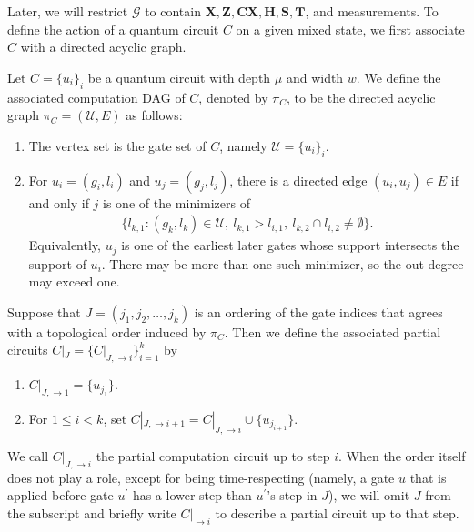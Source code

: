 Later, we will restrict $\mathcal{G}$ to contain $\mathbf{X}, \mathbf{Z}, \mathbf{CX}, \mathbf{H}, \mathbf{S}, \mathbf{T}$, and measurements. To define the action of a quantum circuit $C$ on a given mixed state, we first associate $C$ with a directed acyclic graph.
\begin{definition}
  \label{def:steps}
  Let $C=\{u_i\}_i$ be a quantum circuit with depth $\mu$ and width $w$. We define the associated computation DAG of $C$, denoted by $\pi_C$, to be the directed acyclic graph $\pi_C=(\mathcal{U},E)$ as follows:
  \begin{enumerate}
    \item The vertex set is the gate set of $C$, namely $\mathcal{U}=\{u_i\}_i$.
    \item For $u_i=(g_i,l_i)$ and $u_j=(g_j,l_j)$, there is a directed edge $(u_i,u_j)\in E$ if and only if $j$ is one of the minimizers of
      \begin{equation*}
        \begin{split}
          \big\{ l_{k,1} : (g_k,l_k)\in \mathcal{U},\ l_{k,1}>l_{i,1},\ l_{k,2}\cap l_{i,2}\neq\emptyset \big\}.
        \end{split}
      \end{equation*}
      Equivalently, $u_j$ is one of the earliest later gates whose support intersects the support of $u_i$. There may be more than one such minimizer, so the out-degree may exceed one.
  \end{enumerate}

  Suppose that $J=(j_1,j_2,\ldots,j_k)$ is an ordering of the gate indices that agrees with a topological order induced by $\pi_C$. Then we define the associated partial circuits $C|_J=\{C|_{J,\rightarrow i}\}_{i=1}^{k}$ by
  \begin{enumerate}
    \item $C|_{J,\rightarrow1}=\{u_{j_1}\}$.
    \item For $1\le i<k$, set $ C|_{J,\rightarrow i+1}=C|_{J,\rightarrow i}\cup\{u_{j_{i+1}}\}$.
  \end{enumerate}
We call $C|_{J,\rightarrow i}$ the partial computation circuit up to step $i$. When the order itself does not play a role, except for being time-respecting (namely, a gate $u$ that is applied before gate $u^{\prime}$ has a lower step than $u^{\prime}$'s step in $J$), we will omit $J$ from the subscript and briefly write $C|_{\rightarrow i}$ to describe a partial circuit up to that step.
\end{definition}

